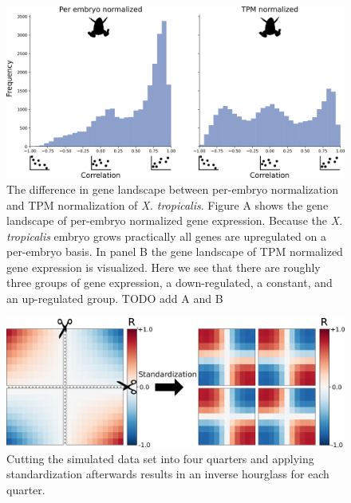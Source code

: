 \begin{figure}[H]
    \includegraphics[width=\linewidth]{ch4.hourglass/images/gene_landscape_normalization.png}
    \caption{The difference in gene landscape between per-embryo normalization and TPM normalization of \textit{X. tropicalis}. Figure A shows the gene landscape of per-embryo normalized gene expression. Because the \textit{X. tropicalis} embryo grows practically all genes are upregulated on a per-embryo basis. In panel B the gene landscape of TPM normalized gene expression is visualized. Here we see that there are roughly three groups of gene expression, a down-regulated, a constant, and an up-regulated group. TODO add A and B}
    \label{fig:genelandscapenormalization}
\end{figure}

\begin{figure}[H]
    \includegraphics[width=\linewidth]{ch4.hourglass/images/sim_normalisation.png}
    \caption{Cutting the simulated data set into four quarters and applying standardization afterwards results in an inverse hourglass for each quarter.}
    \label{fig:sim_normalisation}
\end{figure}

